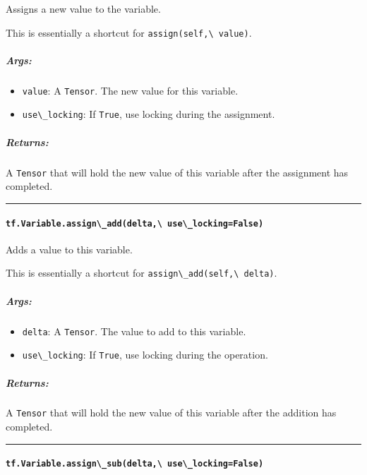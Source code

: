 Assigns a new value to the variable.

This is essentially a shortcut for \lstinline{assign(self,\ value)}.

\subparagraph{Args: }\label{args-1}

\begin{itemize}
\tightlist
\item
  \lstinline{value}: A \lstinline{Tensor}. The new value for this variable.
\item
  \lstinline{use\_locking}: If \lstinline{True}, use locking during the
  assignment.
\end{itemize}

\subparagraph{Returns: }\label{returns-2}

A \lstinline{Tensor} that will hold the new value of this variable after
the assignment has completed.

\begin{center}\rule{0.5\linewidth}{\linethickness}\end{center}

\paragraph{\texorpdfstring{\lstinline{tf.Variable.assign\_add(delta,\ use\_locking=False)}
}{tf.Variable.assign\_add(delta, use\_locking=False) }}\label{tf.variable.assignux5fadddelta-useux5flockingfalse}

Adds a value to this variable.

This is essentially a shortcut for \lstinline{assign\_add(self,\ delta)}.

\subparagraph{Args: }\label{args-2}

\begin{itemize}
\tightlist
\item
  \lstinline{delta}: A \lstinline{Tensor}. The value to add to this variable.
\item
  \lstinline{use\_locking}: If \lstinline{True}, use locking during the
  operation.
\end{itemize}

\subparagraph{Returns: }\label{returns-3}

A \lstinline{Tensor} that will hold the new value of this variable after
the addition has completed.

\begin{center}\rule{0.5\linewidth}{\linethickness}\end{center}

\paragraph{\texorpdfstring{\lstinline{tf.Variable.assign\_sub(delta,\ use\_locking=False)}
}{tf.Variable.assign\_sub(delta, use\_locking=False) }}\label{tf.variable.assignux5fsubdelta-useux5flockingfalse}

